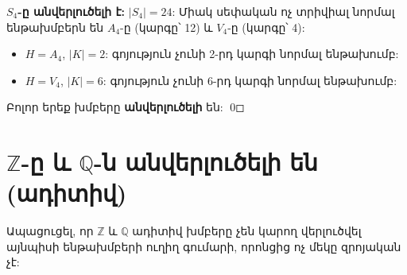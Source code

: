 \documentclass[12pt,a4paper]{article}
\newcommand{\armtext}{} %
\newenvironment{problem}{\begin{mdframed}[style=problemstyle]\armtext}{\end{mdframed}}
\newenvironment{sol}{\begin{mdframed}[style=solstyle]\armtext}{\end{mdframed}}
\newcommand{\Z}{\mathbb{Z}}
\newcommand{\Q}{\mathbb{Q}}
\begin{document}
\begin{sol}
\textbf{\color{SectCol}$S_4$-ը անվերլուծելի է:}\;
$|S_4|=24$: Միակ սեփական ոչ տրիվիալ նորմալ ենթախմբերն են $A_4$-ը (կարգը՝ 12)
և $V_4$-ը (կարգը՝ 4):
\begin{itemize}[leftmargin=*]
  \item $H = A_4$, $|K|=2$: գոյություն չունի 2-րդ կարգի նորմալ ենթախումբ:
  \item $H = V_4$, $|K|=6$: գոյություն չունի 6-րդ կարգի նորմալ ենթախումբ:
\end{itemize}

Բոլոր երեք խմբերը \textbf{անվերլուծելի} են: \qed
\end{sol}

\bigskip
\section{\armtext{$\Z$-ը և $\Q$-ն անվերլուծելի են (ադիտիվ)}}

\begin{problem}
Ապացուցել, որ $\Z$ և $\Q$ ադիտիվ խմբերը չեն կարող վերլուծվել այնպիսի ենթախմբերի ուղիղ գումարի, որոնցից ոչ մեկը զրոյական չէ:
\end{problem}
\end{document}
